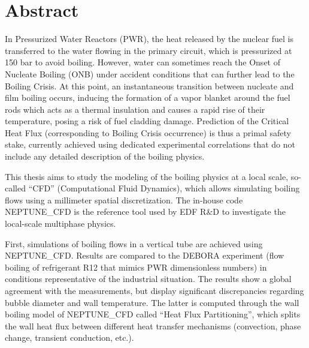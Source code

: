 


\begingroup
\let\clearpage\relax
\let\cleardoublepage\relax
\let\cleardoublepage\relax

\chapter*{Abstract}

In Pressurized Water Reactors (PWR), the heat released by the nuclear fuel is transferred to the water flowing in the primary circuit, which is pressurized at 150 bar to avoid boiling. However, water can sometimes reach the Onset of Nucleate Boiling (ONB) under accident conditions that can further lead to the Boiling Crisis. At this point, an instantaneous transition between nucleate and film boiling occurs, inducing the formation of a vapor blanket around the fuel rods which acts as a thermal insulation and  causes a rapid rise of their temperature, posing a risk of fuel cladding damage. Prediction of the Critical Heat Flux (corresponding to Boiling Crisis occurrence) is thus a primal safety stake, currently achieved using dedicated experimental correlations that do not include any detailed description of the boiling physics.

\npar

This thesis aims to study the modeling of the boiling physics at a local scale, so-called  “CFD” (Computational Fluid Dynamics), which allows simulating boiling flows using a millimeter spatial discretization. The in-house code NEPTUNE\_CFD is the reference tool used by EDF R\&D to investigate the local-scale multiphase physics.

\npar

First, simulations of boiling flows in a vertical tube are achieved using NEPTUNE\_CFD. Results are compared to the DEBORA experiment (flow boiling of refrigerant R12 that mimics PWR dimensionless numbers) in conditions representative of the industrial situation. The results show a global agreement with the measurements, but display significant discrepancies regarding bubble diameter and wall temperature. The latter is computed through the wall boiling model of NEPTUNE\_CFD called “Heat Flux Partitioning”, which splits the wall heat flux between different heat transfer mechanisms (convection, phase change, transient conduction, etc.).

